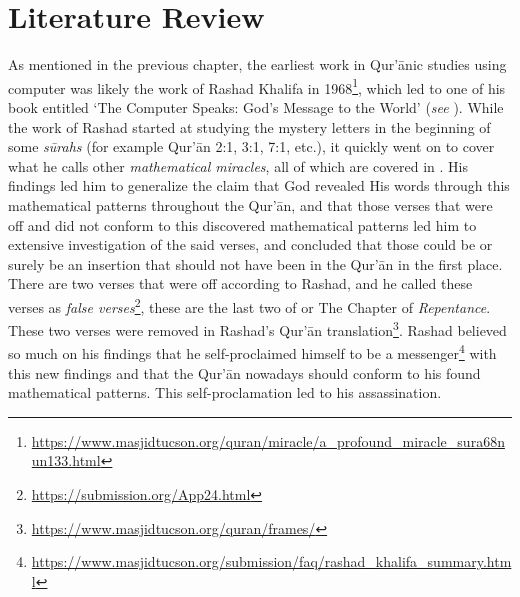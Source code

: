 \chapter{Literature Review}\label{ch:rrl}

As mentioned in the previous chapter, the earliest work in Qur'\=anic studies using computer was likely the work of Rashad Khalifa in 1968\footnote{\url{https://www.masjidtucson.org/quran/miracle/a_profound_miracle_sura68nun133.html}}, which led to one of his book entitled `The Computer Speaks: God's Message to the World' (\textit{see} ). While the work of Rashad started at studying the mystery letters in the beginning of some \textit{s\=urahs}  (for example Qur'\=an 2:1, 3:1, 7:1, etc.), it quickly went on to cover what he calls other \textit{mathematical miracles}, all of which are covered in . His findings led him to generalize the claim that God revealed His words through this mathematical patterns throughout the Qur'\=an, and that those verses that were off and did not conform to this discovered mathematical patterns led him to extensive investigation of the said verses, and concluded that those could be or surely be an insertion that should not have been in the Qur'\=an in the first place. There are two verses that were off according to Rashad, and he called these verses as \textit{false verses}\footnote{\url{https://submission.org/App24.html}}, these are the last two   of   or The Chapter of \textit{Repentance}. These two verses were removed in Rashad's Qur'\=an translation\footnote{\url{https://www.masjidtucson.org/quran/frames/}}. Rashad believed so much on his findings that he self-proclaimed himself to be a messenger\footnote{\url{https://www.masjidtucson.org/submission/faq/rashad_khalifa_summary.html}} with this new findings and that the Qur'\=an nowadays should conform to his found mathematical patterns. This self-proclamation led to his assassination.

